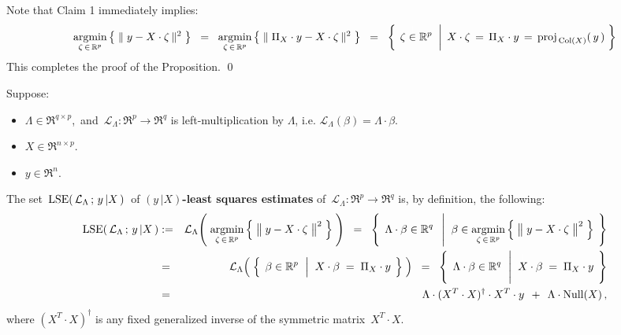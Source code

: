 \vskip 0.5cm
\noindent
Note that Claim 1 immediately implies:
\begin{equation*}
\underset{\zeta\,\in\,\Re^{p}}{\argmin}\left\{\;\Vert\;y - X \cdot \zeta\,\Vert^{2}\;\right\}
\;\; = \;\;
\underset{\zeta\,\in\,\Re^{p}}{\argmin}\left\{\;\Vert\;\Pi_{X} \cdot y - X \cdot \zeta\,\Vert^{2}\;\right\}
\;\; = \;\;
\left\{\;
	\left.
	\zeta \overset{{\color{white}\vert}}{\in} \Re^{p}
	\;\;\right\vert\;
	X \cdot \zeta \,=\, \Pi_{X} \cdot y \,=\, \proj_{\,\Col(X)}(\,y\,)
	\;\right\}
\end{equation*}
This completes the proof of the Proposition.
\qed

\begin{definition}
\mbox{}\vskip 0.1cm\noindent
Suppose:
\begin{itemize}
\item
	$\Lambda \in \Re^{q \times p}$,\,
	and
	\,$\mathcal{L}_{\Lambda} : \Re^{p} \longrightarrow \Re^{q}$ is left-multiplication by $\Lambda$,
	i.e. $\mathcal{L}_{\Lambda}(\beta) = \Lambda \cdot \beta$.
\item
	$X \in \Re^{n \times p}$.
\item
	$y \in \Re^{n}$.
\end{itemize}
The set \,$\textnormal{LSE}\!\left(\,\mathcal{L}_{\Lambda} \,;\, y\,\vert X\,\right)$\,
of \textbf{$(y\,\vert X)$-least squares estimates} of
\,$\mathcal{L}_{\Lambda} : \Re^{p} \longrightarrow \Re^{q}$
is, by definition, the following:
\begin{eqnarray*}
\lse\!\left(\,\mathcal{L}_{\Lambda} \,;\, y\,\vert X\,\right)
&:=&
	\mathcal{L}_{\Lambda}\!\left(\;
		\underset{\zeta\,\in\,\Re^{p}}{\argmin}
		\left\{\;\left\Vert\;\overset{{\color{white}.}}{y} - X\cdot\zeta\;\right\Vert^{2}\;\right\}
		\;\right)
\;\; = \;\;
	\left\{\;\,
		\Lambda\cdot\beta \overset{{\color{white}.}}{\in} \Re^{q}
		\;\;\left\vert\;\;
		\beta \in \underset{\zeta\,\in\,\Re^{p}}{\argmin}
			\left\{\;\left\Vert\;\overset{{\color{white}.}}{y} - X\cdot\zeta\;\right\Vert^{2}\;\right\}
		\right.
		\;\right\}
\\
&=&
	\mathcal{L}_{\Lambda}\!\left(\;
		\left\{\;\,
			\beta \overset{{\color{white}.}}{\in} \Re^{p}
			\;\,\left\vert\;\;
			\overset{{\color{white}.}}{X} \cdot \beta \;=\; \Pi_{X} \cdot y
			\right.
			\;\right\}
		\;\right)
\;\; = \;\;
	\left\{\;\,
		\Lambda\cdot\beta \overset{{\color{white}.}}{\in} \Re^{q}
		\;\,\left\vert\;\;
		\overset{{\color{white}\vert}}{X} \cdot \beta \;=\; \Pi_{X} \cdot y
		\right.
		\;\right\}
\\
&=&
	\Lambda \cdot (X^{T} \cdot X)^{\dagger} \cdot X^{T} \cdot y \;\, + \;\, \Lambda \cdot \Null(X)\,,
\end{eqnarray*}
where $(X^{T} \cdot X)^{\dagger}$ is any fixed generalized inverse
of the symmetric matrix \,$X^{T} \cdot X$.
\end{definition}

